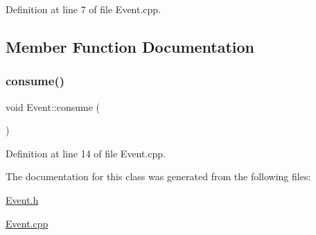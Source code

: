 Definition at line 7 of file Event.\+cpp.



\subsection{Member Function Documentation}
\mbox{\label{class_event_ab57583f1d8975c19bd1c6448482d958d}} 
\subsubsection{\texorpdfstring{consume()}{consume()}}
{\footnotesize\ttfamily void Event\+::consume (\begin{DoxyParamCaption}{ }\end{DoxyParamCaption})}



Definition at line 14 of file Event.\+cpp.



The documentation for this class was generated from the following files\+:\begin{DoxyCompactItemize}
\item 
\hyperlink{_event_8h}{Event.\+h}\item 
\hyperlink{_event_8cpp}{Event.\+cpp}\end{DoxyCompactItemize}
